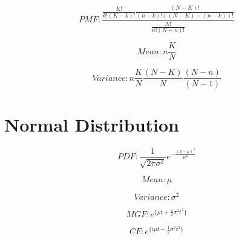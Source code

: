 \documentclass[a4paper,10pt]{book}
\begin{document}
\[
 PMF : \frac{\frac{K!}{k!(K-k)!} \frac{(N-K)!}{(n-k)!((N-K)-(n-k))!}}{\frac{N!}{n!(N-n)!}}
\]

\[
 Mean : n \frac{K}{N}
\]

\[
 Variance : n \frac{K}{N} \frac{(N-K)}{N} \frac{(N-n)}{(N-1)}
\]


\section{Normal Distribution}

\[
 PDF :  \frac{1}{\sqrt{2\pi\sigma^{2}}} e^{-\frac{{(x-\mu)}^2}{2\sigma^2}}
\]


\[
 Mean : \mu
\]

\[
 Variance : \sigma^2
\]

\[
 MGF : e^{\{\mu t + \frac{1}{2}\sigma^2t^2\}}
\]

\[
 CF : e^{\{i\mu t - \frac{1}{2}\sigma^2t^2\}}
\]
\end{document}

